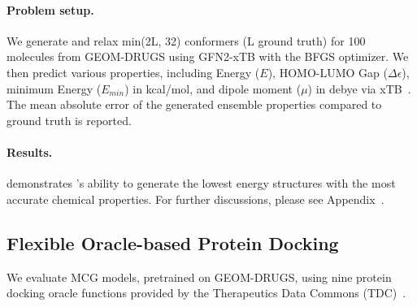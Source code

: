 \paragraph{Problem setup.} %
We generate and relax min(2L, 32) conformers (L ground truth) for 100 molecules from GEOM-DRUGS using GFN2-xTB with the BFGS optimizer. We then predict various properties, including Energy ($E$), HOMO-LUMO Gap ($\Delta \epsilon$), minimum Energy ($E_{min}$) in kcal/mol, and dipole moment ($\mu$) in debye via xTB~\citep{xtb}. The mean absolute error of the generated ensemble properties compared to ground truth is reported. 

\paragraph{Results.} demonstrates \modelns's ability to generate the lowest energy structures with the most accurate chemical properties. For further discussions, please see Appendix~.


\subsection{Flexible Oracle-based Protein Docking}
\label{sec:flex}
We evaluate MCG models, pretrained on GEOM-DRUGS, using nine protein docking oracle functions provided by the Therapeutics Data Commons (TDC)~\citep{tdc}.
